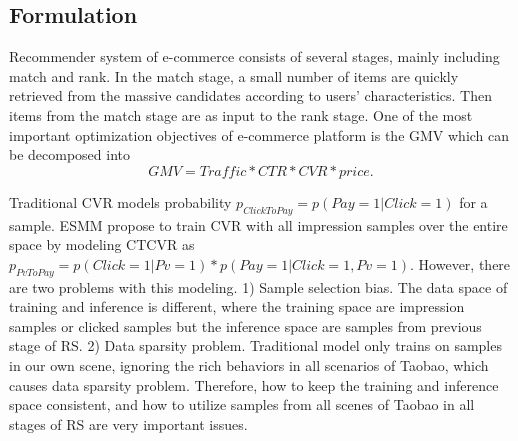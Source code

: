 \documentclass[sigconf]{acmart}
\begin{document}

\subsection{Formulation}
Recommender system of e-commerce consists of several stages, mainly including match and rank. In the match stage, a small number of items are quickly retrieved from the massive candidates according to users’ characteristics. Then items from the match stage are as input to the rank stage. One of the most important optimization objectives of e-commerce platform is the GMV which can be decomposed into 
\begin{equation}
GMV = Traffic * CTR * CVR * price.
\end{equation}


Traditional CVR models probability $p_{ClickToPay} = p(Pay=1|Click=1)$ for a sample. ESMM propose to train CVR with all impression samples over the entire space by modeling CTCVR as $p_{PvToPay} = p(Click=1|Pv=1)*p(Pay=1|Click=1, Pv=1)$.
However, there are two problems with this modeling. 1) Sample selection bias. The data space of training and inference is different, where the training space are impression samples or clicked samples but the inference space are samples from previous stage of RS. 2) Data sparsity problem. Traditional model only trains on samples in our own scene, ignoring the rich behaviors in all scenarios of Taobao, which causes data sparsity problem. Therefore, how to keep the training and inference space consistent, and how to utilize samples from all scenes of Taobao in all stages of RS are very important issues.
\end{document}
